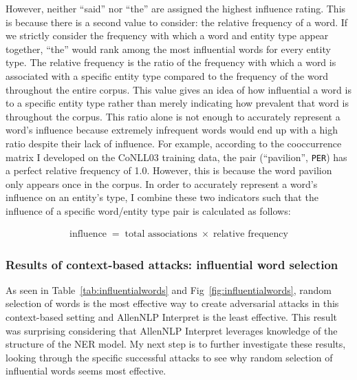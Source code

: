 However, neither ``said'' nor ``the'' are assigned the highest influence rating. This is because there is a second value to consider: the relative frequency of a word. If we strictly consider the frequency with which a word and entity type appear together, ``the'' would rank among the most influential words for every entity type. The relative frequency is the ratio of the frequency with which a word is associated with a specific entity type compared to the frequency of the word throughout the entire corpus. This value gives an idea of how influential a word is to a specific entity type rather than merely indicating how prevalent that word is throughout the corpus. This ratio alone is not enough to accurately represent a word's influence because extremely infrequent words would end up with a high ratio despite their lack of influence. For example, according to the cooccurrence matrix I developed on the CoNLL03 training data, the pair (``pavilion'', \texttt{PER}) has a perfect relative frequency of 1.0. However, this is because the word pavilion only appears once in the corpus. In order to accurately represent a word's influence on an entity's type, I combine these two indicators such that the influence of a specific word/entity type pair is calculated as follows:

{
    \begin{align*} 
        \operatorname{influence} = \operatorname{total\ associations} \times \operatorname{relative\ frequency}
    \end{align*} 
}

\subsubsection{Results of context-based attacks: influential word selection}
\label{sec:contextattackres}
As seen in Table~\ref{tab:influentialwords} and Fig~\ref{fig:influentialwords}, random selection of words is the most effective way to create adversarial attacks in this context-based setting and AllenNLP Interpret is the least effective. This result was surprising considering that AllenNLP Interpret leverages knowledge of the structure of the NER model. My next step is to further investigate these results, looking through the specific successful attacks to see why random selection of influential words seems most effective.

